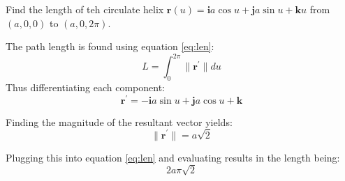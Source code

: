 Find the length of teh circulate helix $\boldsymbol{r}\left(u\right)=\boldsymbol{i}a\cos u +\boldsymbol{j}a\sin u+\boldsymbol{k}u$ from $\left(a,0,0\right)$ to $\left(a, 0, 2\pi\right)$.

The path length is found using equation \ref{eq:len}:
\begin{equation}
	L=\int_0^{2\pi}\|\boldsymbol{r}^\prime\| du
	\label{eq:len}
\end{equation}
Thus differentiating each component:
\begin{equation*}
	\boldsymbol{r}^\prime=-\boldsymbol{i}a\sin u+\boldsymbol{j}a\cos u+\boldsymbol{k}
\end{equation*}

Finding the magnitude of the resultant vector yields:
\begin{equation*}
	\|\boldsymbol{r}^\prime\|=a\sqrt{2}
\end{equation*}

Plugging this into equation \ref{eq:len} and evaluating results in the length being:
\begin{equation*}
	\boxed{2a\pi\sqrt{2}}
\end{equation*}